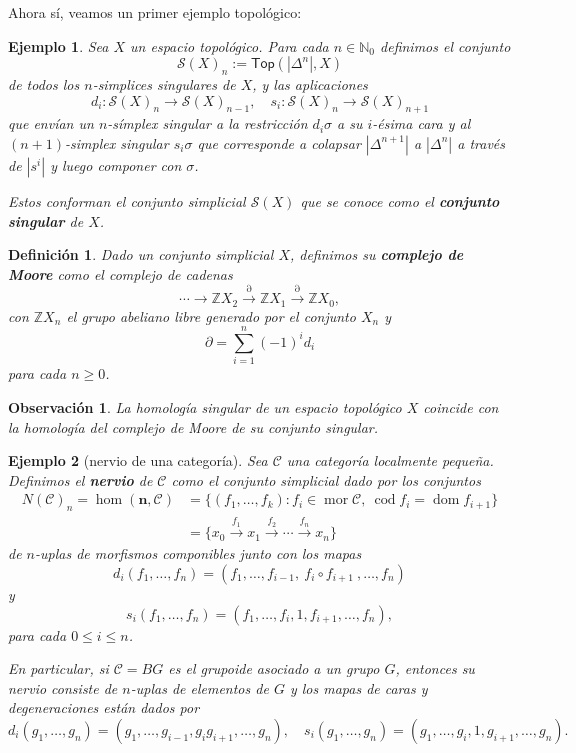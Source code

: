 \documentclass[11pt]{report}
\theoremstyle{colored}
\newtheorem{definition}{Definición}[section]
\newtheorem{remark}{Observación}[section]
\newtheorem{example}{Ejemplo}[section]
\newcommand{\N}{\mathbb{N}}
\newcommand{\Z}{\mathbb{Z}}
\newcommand{\cat}[1]{\mathsf{#1}}
\renewcommand{\ss}[1]{\Delta^{#1}}
\begin{document}
Ahora sí, veamos un primer ejemplo topológico:

\begin{example} Sea $X$ un espacio topológico. Para cada $n \in \N_0$ definimos el conjunto
\[
\mathcal{S}(X)_n := \cat{Top}(|\ss{n}|,X)
\]
de todos los $n$-simplices singulares de $X$, y las aplicaciones 
\[
d_i : \mathcal{S}(X)_n \to \mathcal{S}(X)_{n-1}, \quad
s_i : \mathcal{S}(X)_n \to \mathcal{S}(X)_{n+1}
\]
que envían un $n$-símplex singular a la restricción $d_i\sigma$ a su $i$-ésima cara y al $(n+1)$-simplex singular $s_i\sigma$ que corresponde a colapsar $|\ss{n+1}|$ a $|\ss{n}|$ a través de $|s^i|$ y luego componer con $\sigma$.

Estos conforman el conjunto simplicial $\mathcal{S}(X)$ que se conoce como el \textbf{conjunto singular} de $X$.
\end{example}

\begin{definition} Dado un conjunto simplicial $X$, definimos su \textbf{complejo de Moore} como el complejo de cadenas
\[
\cdots \to \Z X_2 \xrightarrow{\partial} \Z X_1 \xrightarrow{\partial} \Z X_0,
\]
con $\Z X_n$ el grupo abeliano libre generado por el conjunto $X_n$ y 
\[
\partial = \sum_{i=1}^n(-1)^i d_i
\]
para cada $n \geq 0$.
\end{definition}

\begin{remark} La homología singular de un espacio topológico $X$ coincide con la homología del complejo de Moore de su conjunto singular.
\end{remark}

\begin{example}[nervio de una categoría] Sea $\mathscr{C}$ una categoría localmente pequeña. Definimos el \textbf{nervio} de  $\mathscr{C}$ como el conjunto simplicial dado por los conjuntos
\begin{align*}
N(\mathscr{C})_n = \hom(\mathbf{n},\mathscr{C}) &= \{(f_1,\dots, f_k) : f_i \in \operatorname{mor} \mathscr{C}, \ \operatorname{cod} f_i = \operatorname{dom}f_{i+1}\}\\
& = \{x_0 \xrightarrow{f_1} x_1 \xrightarrow{f_2} \cdots \xrightarrow{f_n} x_n\}
\end{align*}
de $n$-uplas de morfismos componibles junto con los mapas 
\[
d_i(f_1, \dots, f_n) = (f_1, \dots,f_{i-1}, \ f_i \circ f_{i+1} \ ,\dots,f_n)
\]
y
\[
s_i(f_1, \dots, f_n) = (f_1, \dots, f_i, 1, f_{i+1},\dots,f_n),
\]
para cada $0 \leq i \leq n$. 

En particular, si $\mathscr{C} = BG$ es el grupoide asociado a un grupo $G$, entonces su nervio consiste de $n$-uplas de elementos de $G$ y los mapas de caras y degeneraciones están dados por
\[
d_i(g_1, \dots, g_n) = (g_1,\dots, g_{i-1},g_ig_{i+1},\dots,g_n), \quad s_i(g_1, \dots,g_n) = (g_1, \dots,g_i,1,g_{i+1},\dots,g_n).
\]
\end{example}
\end{document}
